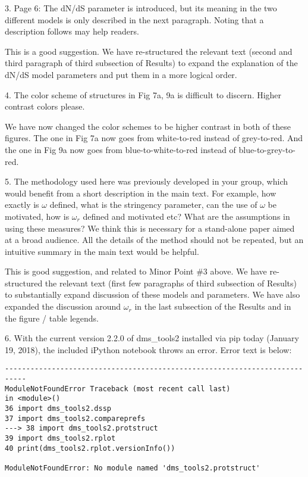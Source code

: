 \documentclass[11pt, oneside]{article}   	%
\begin{document}
3. Page 6: The dN/dS parameter is introduced, but its meaning in the two different models is only described in the next paragraph. Noting that a description follows may help readers. 

{\color{black}
This is a good suggestion.
We have re-structured the relevant text (second and third paragraph of third subsection of Results) to expand the explanation of the dN/dS model parameters and put them in a more logical order.}

4. The color scheme of structures in Fig 7a, 9a is difficult to discern. Higher contrast colors please. 

{\color{black}
We have now changed the color schemes to be higher contrast in both of these figures.
The one in Fig 7a now goes from white-to-red instead of grey-to-red.
And the one in Fig 9a now goes from blue-to-white-to-red instead of blue-to-grey-to-red.}

5. The methodology used here was previously developed in your group, which would benefit from a short description in the main text. For example, how exactly is $\omega$ defined, what is the stringency parameter, can the use of $\omega$ be motivated, how is $\omega_r$ defined and motivated etc? What are the assumptions in using these measures? We think this is necessary for a stand-alone paper aimed at a broad audience. All the details of the method should not be repeated, but an intuitive summary in the main text would be helpful. 

{\color{black}
This is good suggestion, and related to Minor Point \#3 above.
We have re-structured the relevant text (first few paragraphs of third subsection of Results) to substantially expand discussion of these models and parameters.
We have also expanded the discussion around $\omega_r$ in the last subsection of the Results and in the figure / table legends.}

6. With the current version 2.2.0 of dms\_tools2 installed via pip today (January 19, 2018), the included iPython notebook throws an error. Error text is below: 
\begin{verbatim}
--------------------------------------------------------------------------- 
ModuleNotFoundError Traceback (most recent call last) 
in <module>() 
36 import dms_tools2.dssp 
37 import dms_tools2.compareprefs 
---> 38 import dms_tools2.protstruct 
39 import dms_tools2.rplot 
40 print(dms_tools2.rplot.versionInfo()) 

ModuleNotFoundError: No module named 'dms_tools2.protstruct'
\end{verbatim}
\end{document}

